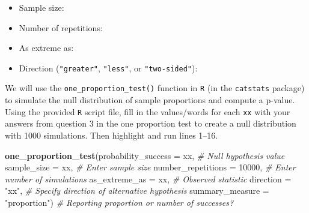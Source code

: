 \documentclass[
]{report}
\newenvironment{Shaded}{\begin{snugshade}}{\end{snugshade}}
\newcommand{\AttributeTok}[1]{\textcolor[rgb]{0.13,0.29,0.53}{#1}}
\newcommand{\CommentTok}[1]{\textcolor[rgb]{0.56,0.35,0.01}{\textit{#1}}}
\newcommand{\DecValTok}[1]{\textcolor[rgb]{0.00,0.00,0.81}{#1}}
\newcommand{\FunctionTok}[1]{\textcolor[rgb]{0.13,0.29,0.53}{\textbf{#1}}}
\newcommand{\NormalTok}[1]{#1}
\newcommand{\StringTok}[1]{\textcolor[rgb]{0.31,0.60,0.02}{#1}}
\providecommand{\tightlist}{%
  \setlength{\itemsep}{0pt}\setlength{\parskip}{0pt}}
\begin{document}
\begin{itemize}
\tightlist
\item
  Sample size:
\end{itemize}

\vspace{.2in}

\begin{itemize}
\tightlist
\item
  Number of repetitions:
\end{itemize}

\vspace{.2in}

\begin{itemize}
\tightlist
\item
  As extreme as:
\end{itemize}

\vspace{.2in}

\begin{itemize}
\tightlist
\item
  Direction (\texttt{"greater"}, \texttt{"less"}, or \texttt{"two-sided"}):
\end{itemize}

We will use the \texttt{one\_proportion\_test()} function in \texttt{R} (in the \texttt{catstats} package) to simulate the null distribution of sample proportions and compute a p-value. Using the provided \texttt{R} script file, fill in the values/words for each \texttt{xx} with your answers from question 3 in the one proportion test to create a null distribution with 1000 simulations. Then highlight and run lines 1--16.

\begin{Shaded}
\begin{Highlighting}[]
\FunctionTok{one\_proportion\_test}\NormalTok{(}\AttributeTok{probability\_success =}\NormalTok{ xx, }\CommentTok{\# Null hypothesis value}
          \AttributeTok{sample\_size =}\NormalTok{ xx, }\CommentTok{\# Enter sample size}
          \AttributeTok{number\_repetitions =} \DecValTok{10000}\NormalTok{, }\CommentTok{\# Enter number of simulations}
          \AttributeTok{as\_extreme\_as =}\NormalTok{ xx, }\CommentTok{\# Observed statistic}
          \AttributeTok{direction =} \StringTok{"xx"}\NormalTok{, }\CommentTok{\# Specify direction of alternative hypothesis}
          \AttributeTok{summary\_measure =} \StringTok{"proportion"}\NormalTok{) }\CommentTok{\# Reporting proportion or number of successes?}
\end{Highlighting}
\end{Shaded}
\end{document}
